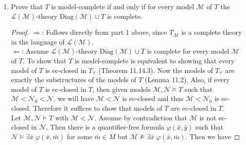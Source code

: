 \documentclass{article}
\begin{document}
\begin{enumerate}[label={\bf Q\arabic*:}]
\begin{enumerate}[label={\bf(\arabic*)}]
      \item Prove that $T$ is model-complete if and only if for every model
        $\mathcal{M}$ of $T$ the $\mathcal{L}(\mathcal{M})$-theory
        $\text{Diag}(\mathcal{M})\cup T$ is complete.

        \begin{proof}
          $\Rightarrow$: Follows directly from part 1 above, since
          $T_\mathcal{M}$ is a complete theory in the language of
          $\mathcal{L}(\mathcal{M})$. \\

          $\Leftarrow$: Assume $\mathcal{L}(\mathcal{M})$-theory
          $\text{Diag}(\mathcal{M})\cup T$ is complete for every model
          $\mathcal{M}$ of $T$. To show that $T$ is model-complete is
          equivalent to showing that every model of $T$ is ec-closed in
          $T_\forall$ (Theorem 11.14.3). Now the models of $T_\forall$ are
          exactly the substructures of the models of $T$ (Lemma 11.2).
          Also, if every model of $T$ is ec-closed in $T$, then given
          models $\mathcal{M},\mathcal{N}\models T$ such that
          $\mathcal{M}<\mathcal{N}_0<\mathcal{N}$, we will have
          $\mathcal{M}<\mathcal{N}$ is ec-closed and thus
          $\mathcal{M}<\mathcal{N}_0$ is ec-closed. Therefore it suffices
          to show that models of $T$ are ec-closed in $T$. \\

          Let $\mathcal{M},\mathcal{N}\models T$ with
          $\mathcal{M}<\mathcal{N}$. Assume by contradiction that
          $\mathcal{M}$ is not ec-closed in $\mathcal{N}$. Then there is a
          quantifier-free formula $\varphi(\bar{x},\bar{y})$ such that
          $\mathcal{N}\models\exists\bar{x}\; \varphi(\bar{x},\bar{m})$ for
          some $\bar{m}\in M$ but $\mathcal{M}\not\models\exists\bar{x}\;
          \varphi(\bar{x},\bar{m})$. Then we have


\end{proof}
\end{enumerate}
\end{enumerate}
\end{document}
